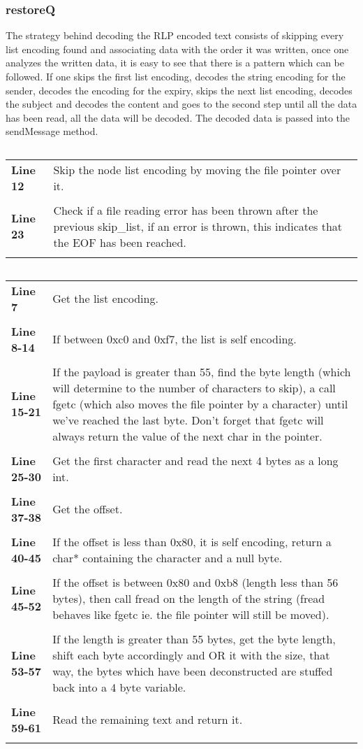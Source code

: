 \documentclass[a4paper, 12pt, titlepage]{article}
\newenvironment{code}{\captionsetup{type=listing}}{}
\newcommand{\sourcecode}[3]{
    \begin{code}
      \inputminted[linenos,numbersep=5pt,gobble=0,frame=lines,framesep=2mm,]{c}{#1}
        \caption{#2}
        \label{lst: #3}
    \end{code}
  }
\newcommand{\explainline}[2]{
  \textbf{Line #1} & #2 \\ \\
}
\begin{document}
\begin{onehalfspacing}
   \clearpage

   \subsubsection{restoreQ}
   The strategy behind decoding the RLP encoded text consists of skipping every list encoding found and associating data with the order it was written, once one analyzes the written data, it is easy to see that there is a pattern which can be followed. If one skips the first list encoding, decodes the string encoding for the sender, decodes the encoding for the expiry, skips the next list encoding, decodes the subject and decodes the content and goes to the second step until all the data has been read, all the data will be decoded. The decoded data is passed into the sendMessage method.

   \sourcecode{snippets/task2b/restoreQ.c}{restoreQ method implementation}{task2b_restoreQ}
   \begin{longtable}{l p{10cm}}
     \explainline{12}{Skip the node list encoding by moving the file pointer over it.}
     \explainline{23}{Check if a file reading error has been thrown after the previous skip\_list, if an error is thrown, this indicates that the EOF has been reached.}
   \end{longtable}

   \sourcecode{snippets/task2b/file_functions.c}{Helper functions used to decode from the previously RLP encoded file.}{file_functions}
   \begin{longtable}{l p{10cm}}
     \explainline{7}{Get the list encoding.}
     \explainline{8-14}{If between 0xc0 and 0xf7, the list is self encoding.}
     \explainline{15-21}{If the payload is greater than 55, find the byte length (which will determine to the number of characters to skip), a call fgetc (which also moves the file pointer by a character) until we've reached the last byte. Don't forget that fgetc will always return the value of the next char in the pointer.}
     \explainline{25-30}{Get the first character and read the next 4 bytes as a long int.}
     \explainline{37-38}{Get the offset.}
     \explainline{40-45}{If the offset is less than 0x80, it is self encoding, return a char* containing the character and a null byte.}
     \explainline{45-52}{If the offset is between 0x80 and 0xb8 (length less than 56 bytes), then call fread on the length of the string (fread behaves like fgetc ie. the file pointer will still be moved).}
     \explainline{53-57}{If the length is greater than 55 bytes, get the byte length, shift each byte accordingly and OR it with the size, that way, the bytes which have been deconstructed are stuffed back into a 4 byte variable.}
     \explainline{59-61}{Read the remaining text and return it.}
   \end{longtable}


\end{onehalfspacing}
\end{document}
